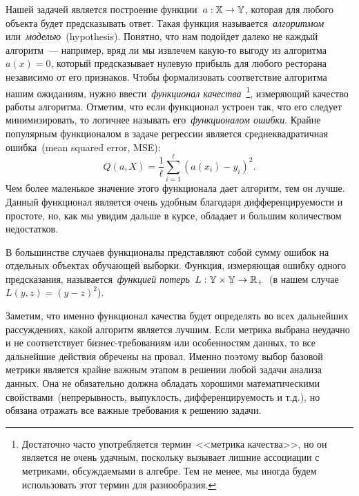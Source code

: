 \documentclass[12pt,fleqn]{article}
\begin{document}
Нашей задачей является построение функции~$a: \mathbb{X} \to \mathbb{Y}$,
которая для любого объекта будет предсказывать ответ.
Такая функция называется~\emph{алгоритмом} или~\emph{моделью}~(hypothesis).
Понятно, что нам подойдет далеко не каждый алгоритм~--- например,
вряд ли мы извлечем какую-то выгоду из алгоритма~$a(x) = 0$,
который предсказывает нулевую прибыль для любого ресторана независимо от его признаков.
Чтобы формализовать соответствие алгоритма нашим ожиданиям,
нужно ввести~\emph{функционал качества}~\footnote{Достаточно часто употребляется
    термин~<<метрика качества>>, но он является не очень удачным,
    поскольку вызывает лишние ассоциации с метриками, обсуждаемыми в алгебре.
    Тем не менее, мы иногда будем использовать этот термин для разнообразия.},
измеряющий качество работы алгоритма.
Отметим, что если функционал устроен так, что его следует минимизировать, то логичнее
называть его~\emph{функционалом ошибки}.
Крайне популярным функционалом в задаче регрессии является среднеквадратичная ошибка~(mean
squared error, MSE):
\[
    Q(a, X)
    =
    \frac{1}{\ell}
    \sum_{i = 1}^{\ell}
        \left(
            a(x_i) - y_i
        \right)^2.
\]
Чем более маленькое значение этого функционала дает алгоритм, тем он лучше.
Данный функционал является очень удобным благодаря дифференцируемости и простоте,
но, как мы увидим дальше в курсе, обладает и большим количеством недостатков.

В большинстве случаев функционалы представляют собой сумму ошибок на отдельных
объектах обучающей выборки.
Функция, измеряющая ошибку одного предсказания, называется~\emph{функцией потерь}~$L: \YY \times \YY \to \RR_+$~(в нашем
случае~$L(y, z) = (y - z)^2$).

Заметим, что именно функционал качества будет определять во всех дальнейших рассуждениях,
какой алгоритм является лучшим.
Если метрика выбрана неудачно и не соответствует бизнес-требованиям
или особенностям данных, то все дальнейшие действия обречены на провал.
Именно поэтому выбор базовой метрики является крайне важным этапом в решении любой задачи анализа данных.
Она не обязательно должна обладать хорошими математическими свойствами~(непрерывность, выпуклость,
дифференцируемость и т.д.), но обязана отражать все важные требования к решению задачи.
\end{document}
